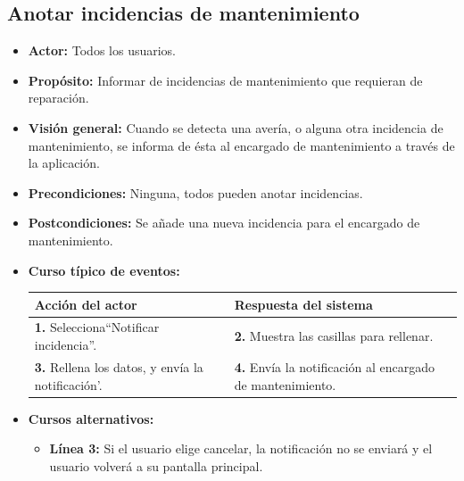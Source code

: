 \documentclass[spanish,a4paper,11pt, twoside]{report}	%
\begin{document}

		\subsection{Anotar incidencias de mantenimiento}	
			\begin{itemize}
				\item \textbf{Actor:} Todos los usuarios.
				\item \textbf{Propósito:} Informar de incidencias de mantenimiento que requieran de reparación. 		
				\item \textbf{Visión general:} Cuando se detecta una avería, o alguna otra
					incidencia de mantenimiento, se informa de ésta al encargado de mantenimiento a
					través de la aplicación.
				\item \textbf{Precondiciones:} Ninguna, todos pueden anotar incidencias.
				\item \textbf{Postcondiciones:}  Se añade una nueva incidencia para el encargado de mantenimiento.
				\item \textbf{Curso típico de eventos:}\\ 
				\begin{tabular}{|p{6cm}||p{6cm}|}
					\hline
					\textbf{Acción del actor} & \textbf{Respuesta del sistema} \\ \hline \hline
					\textbf{1.} Selecciona``Notificar incidencia''. & 
					\textbf{2.} Muestra las casillas para rellenar.\\ \hline 
					\textbf{3.} Rellena los datos, y envía la notificación'. & 
					\textbf{4.} Envía la notificación al encargado de mantenimiento.\\ \hline
					
				\end{tabular}
				\item \textbf{Cursos alternativos:} 
					\begin{itemize}
						\item \textbf{Línea 3: }Si el usuario elige cancelar, la notificación no se enviará y el usuario volverá a su pantalla principal.
					\end{itemize}
			\end {itemize}
\end{document}
